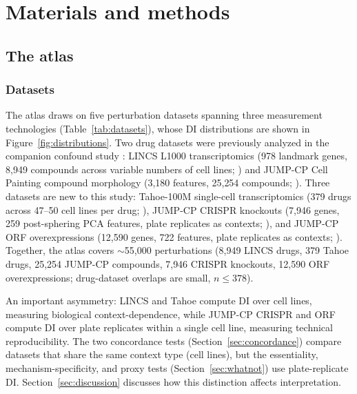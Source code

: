 \documentclass[11pt]{article}
\begin{document}
\section*{Materials and methods}\label{sec:methods}
\subsection*{The atlas}
\label{sec:atlas}

\subsubsection*{Datasets}

The atlas draws on five perturbation datasets spanning three measurement
technologies (Table~\ref{tab:datasets}), whose DI distributions are shown in
Figure~\ref{fig:distributions}.  Two drug datasets were
previously analyzed in the companion confound study
\citep{tower2026confound}: LINCS L1000 transcriptomics (978 landmark
genes, 8{,}949 compounds across variable numbers of cell lines;
\citealp{subramanian2017next}) and JUMP-CP Cell Painting compound
morphology (3{,}180 features, 25{,}254 compounds;
\citealp{chandrasekaran2024cpjump1}).  Three datasets are new to this
study: Tahoe-100M single-cell transcriptomics (379 drugs across 47--50
cell lines per drug; \citealp{tahoe2025}), JUMP-CP CRISPR knockouts
(7{,}946 genes, 259 post-sphering PCA features, plate replicates as
contexts; \citealp{chandrasekaran2025morphmap}), and JUMP-CP ORF
overexpressions (12{,}590 genes, 722 features, plate replicates as
contexts; \citealp{chandrasekaran2025morphmap}).
Together, the atlas covers ${\sim}$55{,}000 perturbations (8{,}949
LINCS drugs, 379 Tahoe drugs, 25{,}254 JUMP-CP compounds, 7{,}946
CRISPR knockouts, 12{,}590 ORF overexpressions; drug-dataset overlaps
are small, $n \leq 378$).

An important asymmetry: LINCS and Tahoe compute DI over cell lines,
measuring biological context-dependence, while JUMP-CP CRISPR and ORF
compute DI over plate replicates within a single cell line, measuring
technical reproducibility.  The two concordance tests
(Section~\ref{sec:concordance}) compare datasets that share the same
context type (cell lines), but the essentiality, mechanism-specificity,
and proxy tests (Section~\ref{sec:whatnot}) use plate-replicate DI.
Section~\ref{sec:discussion} discusses how this distinction affects
interpretation.
\end{document}
